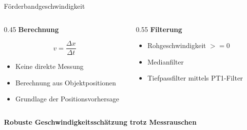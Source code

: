 \documentclass[aspectratio=169]{beamer}
\begin{document}
	\begin{frame}{Förderbandgeschwindigkeit}

		\begin{columns}
		\begin{column}{0.45\textwidth}
		\textbf{Berechnung}
		\vspace{0.5em}

		\[
		v = \frac{\Delta x}{\Delta t}
		\]

		\begin{itemize}
			\item Keine direkte Messung
			\item Berechnung aus Objektpositionen
			\item Grundlage der Positionsvorhersage
		\end{itemize}

		\end{column}
		\begin{column}{0.55\textwidth}
		\textbf{Filterung}

		\begin{itemize}
			\item Rohgeschwindigkeit $>= 0$ 
			\item Medianfilter
			\item Tiefpassfilter mittels PT1-Filter
		\end{itemize}
		\end{column}
		\end{columns}

		\vspace{0.5cm}
		\centering
		\textbf{Robuste Geschwindigkeitsschätzung trotz Messrauschen}

	\end{frame}
\end{document}
